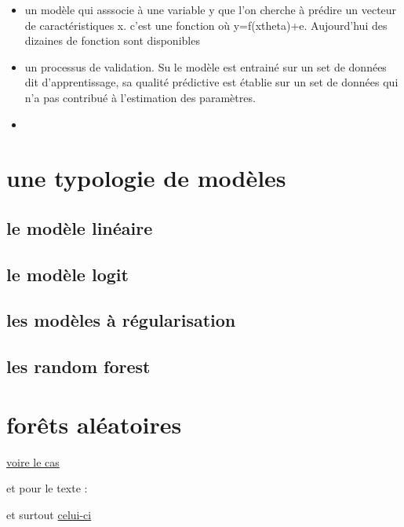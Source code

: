 \documentclass[
]{book}
\begin{document}
\begin{itemize}
\item
  un modèle qui asssocie à une variable y que l'on cherche à prédire un vecteur de caractéristiques x. c'est une fonction où y=f(x\textbar theta)+e. Aujourd'hui des dizaines de fonction sont disponibles
\item
  un processus de validation. Su le modèle est entrainé sur un set de données dit d'apprentissage, sa qualité prédictive est établie sur un set de données qui n'a pas contribué à l'estimation des paramètres.
\item
\end{itemize}

\hypertarget{une-typologie-de-moduxe8les}{%
\section{une typologie de modèles}\label{une-typologie-de-moduxe8les}}

\hypertarget{le-moduxe8le-linuxe9aire}{%
\subsection{le modèle linéaire}\label{le-moduxe8le-linuxe9aire}}

\hypertarget{le-moduxe8le-logit}{%
\subsection{le modèle logit}\label{le-moduxe8le-logit}}

\hypertarget{les-moduxe8les-uxe0-ruxe9gularisation}{%
\subsection{les modèles à régularisation}\label{les-moduxe8les-uxe0-ruxe9gularisation}}

\hypertarget{les-random-forest}{%
\subsection{les random forest}\label{les-random-forest}}

\hypertarget{foruxeats-aluxe9atoires-1}{%
\section{forêts aléatoires}\label{foruxeats-aluxe9atoires-1}}

\href{http://r.benavent.fr/MM.html}{voire le cas}

et pour le texte :

et surtout \href{https://benaventc.github.io/NLPBook/machine-learning-supervis\%C3\%A9-et-nlp.html}{celui-ci}

  
\end{document}
